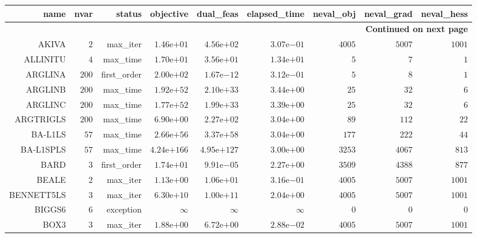 \begin{longtable}{rrrrrrrrr}
\hline
name & nvar & status & objective & dual\_feas & elapsed\_time & neval\_obj & neval\_grad & neval\_hess \\\hline
\endhead
\hline
\multicolumn{9}{r}{{\bfseries Continued on next page}}\\
\hline
\endfoot
\endlastfoot
AKIVA & \(     2\) & max\_iter & \( 1.46\)e\(+01\) & \( 4.56\)e\(+02\) & \( 3.07\)e\(-01\) & \(  4005\) & \(  5007\) & \(  1001\) \\
ALLINITU & \(     4\) & max\_time & \( 1.70\)e\(+01\) & \( 3.56\)e\(+01\) & \( 1.34\)e\(+01\) & \(     5\) & \(     7\) & \(     1\) \\
ARGLINA & \(   200\) & first\_order & \( 2.00\)e\(+02\) & \( 1.67\)e\(-12\) & \( 3.12\)e\(-01\) & \(     5\) & \(     8\) & \(     1\) \\
ARGLINB & \(   200\) & max\_time & \( 1.92\)e\(+52\) & \( 2.10\)e\(+33\) & \( 3.44\)e\(+00\) & \(    25\) & \(    32\) & \(     6\) \\
ARGLINC & \(   200\) & max\_time & \( 1.77\)e\(+52\) & \( 1.99\)e\(+33\) & \( 3.39\)e\(+00\) & \(    25\) & \(    32\) & \(     6\) \\
ARGTRIGLS & \(   200\) & max\_time & \( 6.90\)e\(+00\) & \( 2.27\)e\(+02\) & \( 3.04\)e\(+00\) & \(    89\) & \(   112\) & \(    22\) \\
BA-L1LS & \(    57\) & max\_time & \( 2.66\)e\(+56\) & \( 3.37\)e\(+58\) & \( 3.04\)e\(+00\) & \(   177\) & \(   222\) & \(    44\) \\
BA-L1SPLS & \(    57\) & max\_time & \(4.24\)e\(+166\) & \(4.95\)e\(+127\) & \( 3.00\)e\(+00\) & \(  3253\) & \(  4067\) & \(   813\) \\
BARD & \(     3\) & first\_order & \( 1.74\)e\(+01\) & \( 9.91\)e\(-05\) & \( 2.27\)e\(+00\) & \(  3509\) & \(  4388\) & \(   877\) \\
BEALE & \(     2\) & max\_iter & \( 1.13\)e\(+00\) & \( 1.06\)e\(+01\) & \( 3.16\)e\(-01\) & \(  4005\) & \(  5007\) & \(  1001\) \\
BENNETT5LS & \(     3\) & max\_iter & \( 6.30\)e\(+10\) & \( 1.00\)e\(+11\) & \( 2.04\)e\(+00\) & \(  4005\) & \(  5007\) & \(  1001\) \\
BIGGS6 & \(     6\) & exception & \(\infty\) & \(\infty\) & \(\infty\) & \(     0\) & \(     0\) & \(     0\) \\
BOX3 & \(     3\) & max\_iter & \( 1.88\)e\(+00\) & \( 6.72\)e\(+00\) & \( 2.88\)e\(-02\) & \(  4005\) & \(  5007\) & \(  1001\) \\

\end{longtable}
